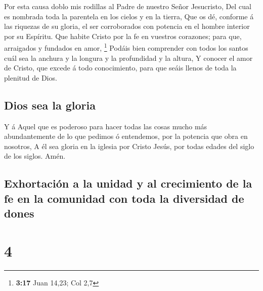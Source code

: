  Por esta causa doblo mis rodillas al Padre de nuestro
Señor Jesucristo,  Del cual es nombrada toda la parentela
en los cielos y en la tierra,  Que os dé, conforme á las
riquezas de su gloria, el ser corroborados con potencia en el hombre
interior por su Espíritu.  Que habite Cristo por la fe en
vuestros corazones; para que, arraigados y fundados en amor, \footnote{\textbf{3:17}
  Juan 14,23; Col 2,7}  Podáis bien comprender con todos
los santos cuál sea la anchura y la longura y la profundidad y la
altura,  Y conocer el amor de Cristo, que excede á todo
conocimiento, para que seáis llenos de toda la plenitud de Dios.

\hypertarget{dios-sea-la-gloria}{%
\subsection{Dios sea la gloria}\label{dios-sea-la-gloria}}

 Y á Aquel que es poderoso para hacer todas las cosas
mucho más abundantemente de lo que pedimos ó entendemos, por la potencia
que obra en nosotros,  A él sea gloria en la iglesia por
Cristo Jesús, por todas edades del siglo de los siglos. Amén.

\hypertarget{exhortaciuxf3n-a-la-unidad-y-al-crecimiento-de-la-fe-en-la-comunidad-con-toda-la-diversidad-de-dones}{%
\subsection{Exhortación a la unidad y al crecimiento de la fe en la
comunidad con toda la diversidad de
dones}\label{exhortaciuxf3n-a-la-unidad-y-al-crecimiento-de-la-fe-en-la-comunidad-con-toda-la-diversidad-de-dones}}

\hypertarget{section-3}{%
\section{4}\label{section-3}}

